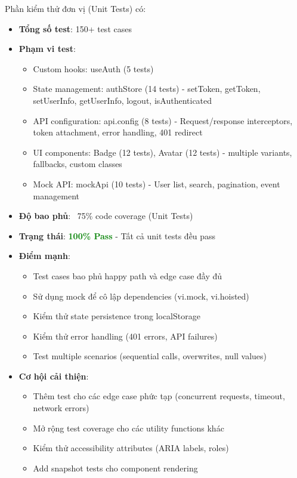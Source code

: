 \documentclass[12pt,a4paper,vietnamese]{article}
\begin{document}
Phần kiểm thử đơn vị (Unit Tests) có:
\begin{itemize}
    \item \textbf{Tổng số test}: 150+ test cases
    \item \textbf{Phạm vi test}: 
    \begin{itemize}
        \item Custom hooks: useAuth (5 tests)
        \item State management: authStore (14 tests) - setToken, getToken, setUserInfo, getUserInfo, logout, isAuthenticated
        \item API configuration: api.config (8 tests) - Request/response interceptors, token attachment, error handling, 401 redirect
        \item UI components: Badge (12 tests), Avatar (12 tests) - multiple variants, fallbacks, custom classes
        \item Mock API: mockApi (10 tests) - User list, search, pagination, event management
    \end{itemize}
    \item \textbf{Độ bao phủ}: ~75\% code coverage (Unit Tests)
    \item \textbf{Trạng thái}: \textcolor{green}{\textbf{100\% Pass}} - Tất cả unit tests đều pass
    \item \textbf{Điểm mạnh}:
    \begin{itemize}
        \item Test cases bao phủ happy path và edge case đầy đủ
        \item Sử dụng mock để cô lập dependencies (vi.mock, vi.hoisted)
        \item Kiểm thử state persistence trong localStorage
        \item Kiểm thử error handling (401 errors, API failures)
        \item Test multiple scenarios (sequential calls, overwrites, null values)
    \end{itemize}
    \item \textbf{Cơ hội cải thiện}:
    \begin{itemize}
        \item Thêm test cho các edge case phức tạp (concurrent requests, timeout, network errors)
        \item Mở rộng test coverage cho các utility functions khác
        \item Kiểm thử accessibility attributes (ARIA labels, roles)
        \item Add snapshot tests cho component rendering
    \end{itemize}
\end{itemize}
\end{document}
